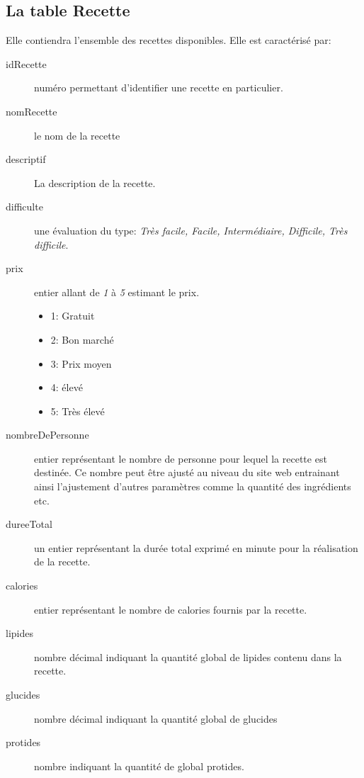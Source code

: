 \subsection{La table Recette}
Elle contiendra l'ensemble des recettes disponibles. Elle est caractérisé par:
\begin{description}
    \item[idRecette] numéro permettant d'identifier une recette en particulier.
    \item[nomRecette] le nom de la recette
    \item[descriptif] La description de la recette.
    \item[difficulte] une évaluation du type: \textit{Très facile, Facile, Intermédiaire, Difficile, Très difficile}.
    \item[prix] entier allant de \textit{1} à \textit{5} estimant le prix.
          \begin{itemize}
              \item 1: Gratuit
              \item 2: Bon marché
              \item 3: Prix moyen
              \item 4: élevé
              \item 5: Très élevé
          \end{itemize}
    \item[nombreDePersonne] entier représentant le nombre de personne pour lequel la recette est destinée. Ce nombre peut être ajusté au niveau du site web entrainant ainsi l'ajustement d'autres paramètres comme la quantité des ingrédients etc.
    \item[dureeTotal] un entier représentant la durée total exprimé en minute pour la réalisation de la recette.
    \item[calories] entier représentant le nombre de calories fournis par la recette.
    \item[lipides] nombre décimal indiquant la quantité global de lipides contenu dans la recette.
    \item[glucides] nombre décimal indiquant la quantité global de glucides
    \item[protides] nombre indiquant la quantité de global protides.
\end{description}

